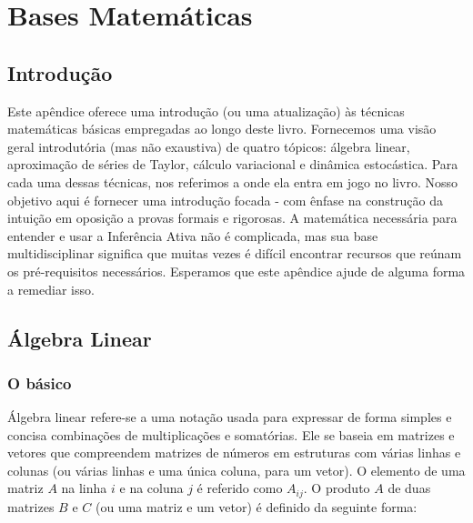 \documentclass[
  12pt,
]{book}
\begin{document}
\cleardoublepage

\hypertarget{appendix-apuxeandice}{%
\appendix}


\hypertarget{bases-matemuxe1ticas}{%
\chapter{Bases Matemáticas}\label{bases-matemuxe1ticas}}

\hypertarget{introduuxe7uxe3o-7}{%
\section{Introdução}\label{introduuxe7uxe3o-7}}

Este apêndice oferece uma introdução (ou uma atualização) às técnicas matemáticas básicas empregadas ao longo deste livro. Fornecemos uma visão geral introdutória (mas não exaustiva) de quatro tópicos: álgebra linear, aproximação de séries de Taylor, cálculo variacional e dinâmica estocástica. Para cada uma dessas técnicas, nos referimos a onde ela entra em jogo no livro. Nosso objetivo aqui é fornecer uma introdução focada - com ênfase na construção da intuição em oposição a provas formais e rigorosas. A matemática necessária para entender e usar a Inferência Ativa não é complicada, mas sua base multidisciplinar significa que muitas vezes é difícil encontrar recursos que reúnam os pré-requisitos necessários. Esperamos que este apêndice ajude de alguma forma a remediar isso.

\hypertarget{uxe1lgebra-linear}{%
\section{Álgebra Linear}\label{uxe1lgebra-linear}}

\hypertarget{o-buxe1sico}{%
\subsection{O básico}\label{o-buxe1sico}}

Álgebra linear refere-se a uma notação usada para expressar de forma simples e concisa combinações de multiplicações e somatórias. Ele se baseia em matrizes e vetores que compreendem matrizes de números em estruturas com várias linhas e colunas (ou várias linhas e uma única coluna, para um vetor). O elemento de uma matriz \(A\) na linha \(i\) e na coluna \(j\) é referido como \(A_{ij}\). O produto \(A\) de duas matrizes \(B\) e \(C\) (ou uma matriz e um vetor) é definido da seguinte forma:
\end{document}
